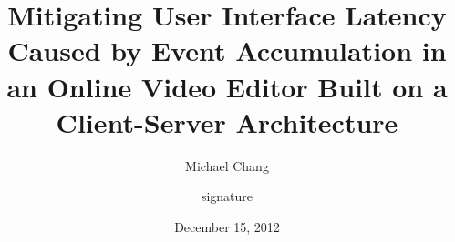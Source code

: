 \documentclass[se,resubmit]{uw-wkrpt}
\begin{document}

\title{ Mitigating User Interface Latency Caused by Event Accumulation in an
Online Video Editor Built on a Client-Server Architecture }

\author{Michael Chang}


\signature{signature}

\address{30 Doncrest Rd.\\*
         Richmond Hill, ON\ \ L4B 1A2}












\date{December 15, 2012}

\maketitle
\end{document}
